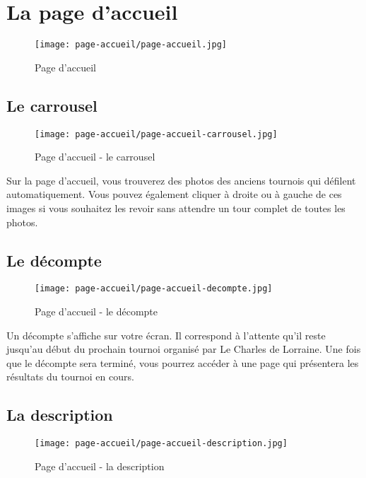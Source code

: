 \section{La page d'accueil}

\begin{figure}[H]
\centering
\texttt{[image: page-accueil/page-accueil.jpg]}
\caption{Page d'accueil}
\end{figure}

\subsection{Le carrousel}

\begin{figure}[H]
\centering
\texttt{[image: page-accueil/page-accueil-carrousel.jpg]}
\caption{Page d'accueil - le carrousel}
\end{figure}

Sur la page d'accueil, vous trouverez des photos des anciens tournois qui
défilent automatiquement. Vous pouvez également cliquer à droite ou à gauche
de ces images si vous souhaitez les revoir sans attendre un tour complet de
toutes les photos. \newline

\subsection{Le décompte}

\begin{figure}[H]
\centering
\texttt{[image: page-accueil/page-accueil-decompte.jpg]}
\caption{Page d'accueil - le décompte}
\end{figure}

Un décompte s'affiche sur votre écran. Il correspond à l'attente qu'il reste
jusqu'au début du prochain tournoi organisé par Le Charles de Lorraine. Une
fois que le décompte sera terminé, vous pourrez accéder à une page qui
présentera les résultats du tournoi en cours. \newline

\subsection{La description}

\begin{figure}[H]
\centering
\texttt{[image: page-accueil/page-accueil-description.jpg]}
\caption{Page d'accueil - la description}
\end{figure}

